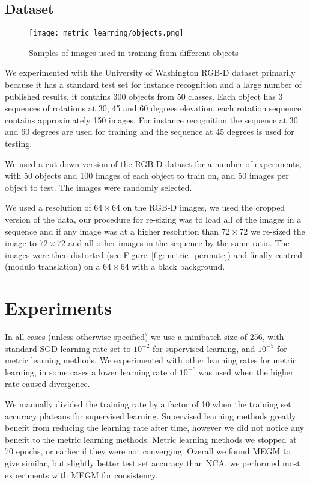 \subsection {Dataset}

\begin{figure}[h]
\centering
\texttt{[image: metric\_learning/objects.png]}
\caption{Samples of images used in training from different objects}
\label{fig:metric_dataset}
\end{figure}

We experimented with the University of Washington RGB-D dataset primarily because it has a standard test set for instance recognition and a large number of published results, it contains 300 objects from 50 classes. Each object has 3 sequences of rotations at 30, 45 and 60 degrees elevation, each rotation sequence contains approximately 150 images. For instance recognition the sequence at 30 and 60 degrees are used for training and the sequence at 45 degrees is used for testing. 

We used a cut down version of the RGB-D dataset for a number of experiments, with 50 objects and 100 images of each object to train on, and 50 images per object to test. The images were randomly selected.

We used a resolution of $ 64\times64 $ on the RGB-D images, we used the cropped version of the data, our procedure for re-sizing was to load all of the images in a sequence and if any image was at a higher resolution than $ 72\times72 $ we re-sized the image to $ 72\times72 $ and all other images in the sequence by the same ratio. The images were then distorted (see Figure~\ref{fig:metric_permute}) and finally centred (modulo translation) on a  $ 64\times64 $ with a black background.


\section {Experiments}


In all cases (unless otherwise specified) we use a minibatch size of 256, with standard \gls{SGD} learning rate set to $ 10^{-2} $ for supervised learning, and $ 10^{-5} $ for metric learning methods. We experimented with other learning rates for metric learning, in some cases a lower learning rate of $ 10^{-6} $ was used when the higher rate caused divergence.

We manually divided the training rate by a factor of 10 when the training set accuracy plateaus for supervised learning. Supervised learning methods greatly benefit from reducing the learning rate after time, however we did not notice any benefit to the metric learning methods. Metric learning methods we stopped at 70 epochs, or earlier if they were not converging. Overall we found \gls{MEGM} to give similar, but slightly better test set accuracy than \gls{NCA}, we performed most experiments with \gls{MEGM} for consistency.



